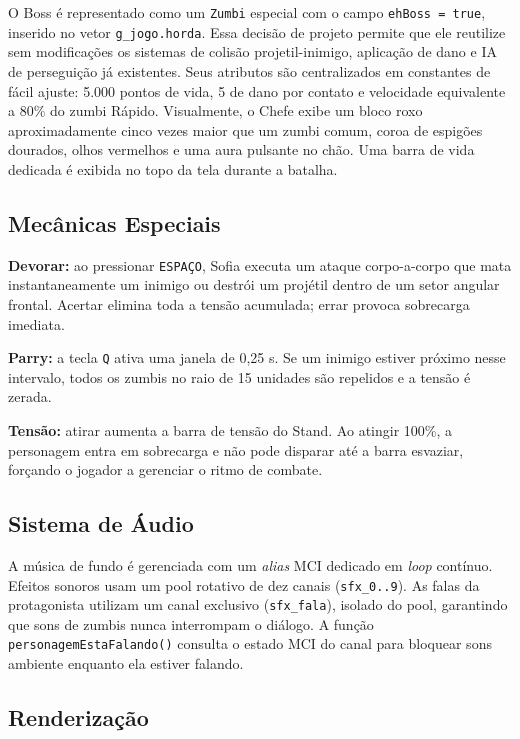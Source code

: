\documentclass[12pt,a4paper]{article}
\begin{document}
O Boss é representado como um \texttt{Zumbi} especial com o campo
\texttt{ehBoss = true}, inserido no vetor \texttt{g\_jogo.horda}.
Essa decisão de projeto permite que ele reutilize sem modificações os sistemas
de colisão projetil-inimigo, aplicação de dano e IA de perseguição já
existentes.
Seus atributos são centralizados em constantes de fácil ajuste:
5.000 pontos de vida, 5 de dano por contato e velocidade equivalente a 80\%
do zumbi Rápido.
Visualmente, o Chefe exibe um bloco roxo aproximadamente cinco vezes maior
que um zumbi comum, coroa de espigões dourados, olhos vermelhos e uma aura
pulsante no chão.
Uma barra de vida dedicada é exibida no topo da tela durante a batalha.

\subsection{Mecânicas Especiais}

\textbf{Devorar:} ao pressionar \texttt{ESPAÇO}, Sofia executa um ataque
corpo-a-corpo que mata instantaneamente um inimigo ou destrói um projétil
dentro de um setor angular frontal.
Acertar elimina toda a tensão acumulada; errar provoca sobrecarga imediata.

\textbf{Parry:} a tecla \texttt{Q} ativa uma janela de 0,25 s.
Se um inimigo estiver próximo nesse intervalo, todos os zumbis no raio de 15
unidades são repelidos e a tensão é zerada.

\textbf{Tensão:} atirar aumenta a barra de tensão do Stand.
Ao atingir 100\%, a personagem entra em sobrecarga e não pode disparar até a
barra esvaziar, forçando o jogador a gerenciar o ritmo de combate.

\subsection{Sistema de Áudio}

A música de fundo é gerenciada com um \textit{alias} MCI dedicado em
\textit{loop} contínuo.
Efeitos sonoros usam um pool rotativo de dez canais (\texttt{sfx\_0..9}).
As falas da protagonista utilizam um canal exclusivo (\texttt{sfx\_fala}),
isolado do pool, garantindo que sons de zumbis nunca interrompam o diálogo.
A função \texttt{personagemEstaFalando()} consulta o estado MCI do canal para
bloquear sons ambiente enquanto ela estiver falando.

\subsection{Renderização}
\end{document}
